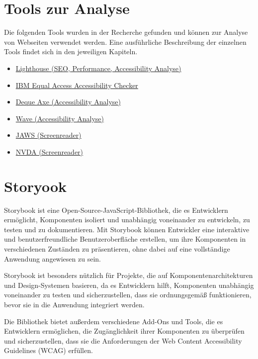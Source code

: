 \section{Tools zur Analyse}

Die folgenden Tools wurden in der Recherche gefunden und können zur Analyse von Webseiten verwendet werden. Eine ausführliche Beschreibung der einzelnen Tools findet sich in den jeweiligen Kapiteln.

\begin{itemize}
    \item \hyperref[sec:a11yToolsLighthouse]{Lighthouse (SEO, Performance, Accessibility Analyse)}
    \item \hyperref[sec:a11yToolsIBMEAAC]{IBM Equal Access Accessibility Checker}
    \item \hyperref[sec:a11yToolsAxe]{Deque Axe (Accessibility Analyse)}
    \item \hyperref[sec:a11yToolsWAVE]{Wave (Accessibility Analyse)}
    \item \hyperref[sec:a11yToolsJAWS]{JAWS (Screenreader)}
    \item \hyperref[sec:a11yToolsNVDA]{NVDA (Screenreader)}
\end{itemize}

\section{Storyook}

Storybook ist eine Open-Source-JavaScript-Bibliothek, die es Entwicklern ermöglicht, Komponenten isoliert und unabhängig voneinander zu entwickeln, zu testen und zu dokumentieren. \cite{storybook_storybook_nodate} Mit Storybook können Entwickler eine interaktive und benutzerfreundliche Benutzeroberfläche erstellen, um ihre Komponenten in verschiedenen Zuständen zu präsentieren, ohne dabei auf eine vollständige Anwendung angewiesen zu sein.

Storybook ist besonders nützlich für Projekte, die auf Komponentenarchitekturen und Design-Systemen basieren, da es Entwicklern hilft, Komponenten unabhängig voneinander zu testen und sicherzustellen, dass sie ordnungsgemäß funktionieren, bevor sie in die Anwendung integriert werden.

Die Bibliothek bietet außerdem verschiedene Add-Ons und Tools, die es Entwicklern ermöglichen, die Zugänglichkeit ihrer Komponenten zu überprüfen und sicherzustellen, dass sie die Anforderungen der Web Content Accessibility Guidelines (WCAG) erfüllen.

